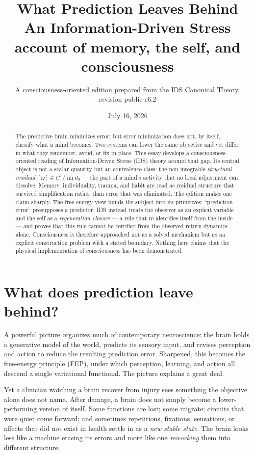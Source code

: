 \documentclass[11pt,a4paper]{article}
\title{\bfseries What Prediction Leaves Behind\\[6pt]
\large An Information-Driven Stress account of memory, the self, and consciousness}
\author{\normalsize A consciousness-oriented edition prepared from the IDS Canonical Theory, revision public-r6.2}
\date{July 16, 2026}
\theoremstyle{plain}
\begin{document}
\maketitle

\begin{abstract}
\noindent
The predictive brain minimizes error; but error minimization does not, by itself, classify what a mind
becomes. Two systems can lower the same objective and yet differ in what they remember, avoid, or fix
in place. This essay develops a consciousness-oriented reading of Information-Driven Stress (IDS)
theory around that gap. Its central object is not a scalar quantity but an equivalence class: the
non-integrable \emph{structural residual} $[\omega]\in C^1/\operatorname{im}d_0$ --- the part of a
mind's activity that no local adjustment can dissolve. Memory, individuality, trauma, and habit are
read as residual structure that survived simplification rather than error that was eliminated. The
edition makes one claim sharply. The free-energy view builds the subject into its primitives:
``prediction error'' presupposes a predictor. IDS instead treats the observer as an explicit variable
and the self as a \emph{regeneration closure} --- a rule that re-identifies itself from the inside ---
and proves that this rule cannot be certified from the observed return dynamics alone. Consciousness is
therefore approached not as a solved mechanism but as an explicit construction problem with a stated
boundary. Nothing here claims that the physical implementation of consciousness has been demonstrated.
\end{abstract}

\medskip
\tableofcontents

\section{What does prediction leave behind?}\label{sec:question}

A powerful picture organizes much of contemporary neuroscience: the brain holds a generative model of
the world, predicts its sensory input, and revises perception and action to reduce the resulting
prediction error. Sharpened, this becomes the free-energy principle (FEP), under which perception,
learning, and action all descend a single variational functional. The picture explains a great deal.

Yet a clinician watching a brain recover from injury sees something the objective alone does not name.
After damage, a brain does not simply become a lower-performing version of itself. Some functions are
lost; some migrate; circuits that were quiet come forward; and sometimes repetitions, fixations,
sensations, or affects that did not exist in health settle in as a \emph{new stable state}. The brain
looks less like a machine erasing its errors and more like one \emph{reworking} them into different
structure.
\end{document}
